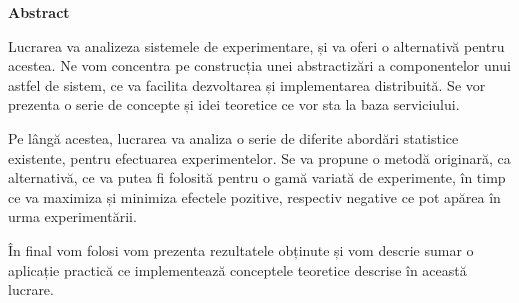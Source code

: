 \thispagestyle{plain}

\vspace*{\fill}

\begin{center}
	\Large \textbf{Abstract}	
\end{center}

Lucrarea va analizeza sistemele de experimentare, și va oferi o alternativă pentru acestea. Ne vom concentra pe construcția unei abstractizări a componentelor unui astfel de sistem, ce va facilita dezvoltarea și implementarea distribuită. Se vor prezenta o serie de concepte și idei teoretice ce vor sta la baza serviciului.

Pe lângă acestea, lucrarea va analiza o serie de diferite abordări statistice existente, pentru efectuarea experimentelor. Se va propune o metodă originară, ca alternativă, ce va putea fi folosită pentru o gamă variată de experimente, în timp ce va maximiza și minimiza efectele pozitive, respectiv negative ce pot apărea în urma experimentării.

În final vom folosi vom prezenta rezultatele obținute și vom descrie sumar o aplicație practică ce implementează conceptele teoretice descrise în această lucrare.

\vspace*{\fill}
